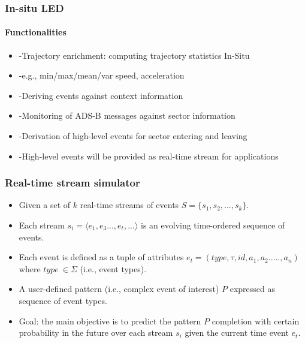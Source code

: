 \frame
{
	\frametitle{In-situ LED}
	\framesubtitle{Functionalities}
	\begin{itemize}[]
	\item-Trajectory enrichment: computing trajectory statistics In-Situ
	\item	-e.g., min/max/mean/var speed, acceleration
	\item	-Deriving events against context information
    \item		-Monitoring of ADS-B messages against sector information
	\item	-Derivation of high-level events for sector entering and leaving
	\item	-High-level events will be provided as real-time stream for applications
		
	\end{itemize}
}

\frame
{
	\frametitle{Real-time stream simulator}
	
	\begin{itemize}[]
		\item<1->Given a set of $k$ real-time streams of events $S = \{ s_1,s_2, ..., s_k\}$.
		
		\item<1 -> Each stream $s_i=\langle e_1,e_3...,e_t,...\rangle$  is an evolving time-ordered sequence of events.
		
		\item<1 -> Each event is defined as a tuple of attributes $e_t = (type,\tau,id,a_1,a_2.....,a_n)$ where $type\ \in  \Sigma$ (i.e., event types). 
		\item<1-> A user-defined pattern (i.e., complex event of interest) $P$ expressed as sequence of event types.
		
		
		\item<1->Goal: the main objective is to predict the pattern $P$ completion with certain probability in the future over each stream $s_i$ given the current time event $e_t$. 
	\end{itemize}
}


